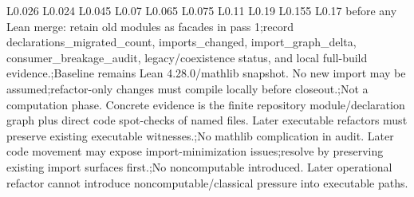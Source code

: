 \begin{longtable}{L{0.026\linewidth} L{0.024\linewidth} L{0.045\linewidth} L{0.07\linewidth} L{0.065\linewidth} L{0.075\linewidth} L{0.11\linewidth} L{0.19\linewidth} L{0.155\linewidth} L{0.17\linewidth}}
before any Lean merge: retain old modules as facades in pass 1;\newline record declarations\_migrated\_count, imports\_changed, import\_graph\_delta, consumer\_breakage\_audit, legacy/\allowbreak{}coexistence status, and local full-build evidence.;\newline Baseline remains Lean 4.28.0/\allowbreak{}mathlib snapshot. No new import may be assumed;\newline refactor-only changes must compile locally before closeout.;\newline Not a computation phase. Concrete evidence is the finite repository module/\allowbreak{}declaration graph plus direct code spot-checks of named files. Later executable refactors must preserve existing executable witnesses.;\newline No mathlib complication in audit. Later code movement may expose import-minimization issues;\newline resolve by preserving existing import surfaces first.;\newline No noncomputable introduced. Later operational refactor cannot introduce noncomputable/\allowbreak{}classical pressure into executable paths.\\
\hline
\addlinespace[0.24em]

\end{longtable}
